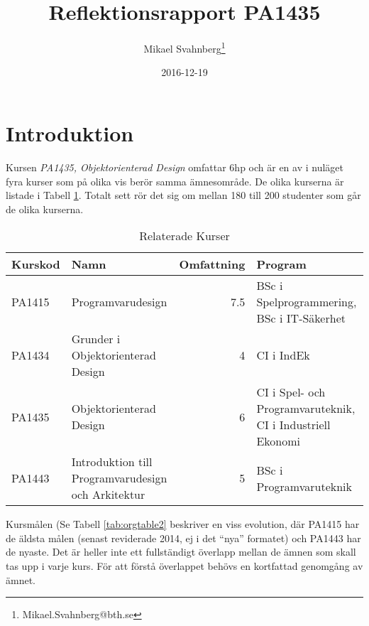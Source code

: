 \documentclass[10pt,t,a4paper]{article}
\author{Mikael Svahnberg\thanks{Mikael.Svahnberg@bth.se}}
\date{2016-12-19}
\title{Reflektionsrapport PA1435}
\begin{document}
\maketitle


\section{Introduktion}
\label{sec:orgheadline2}
Kursen \emph{PA1435, Objektorienterad Design} omfattar 6hp och är en av i nuläget fyra kurser som på olika vis berör samma ämnesområde. De olika kurserna är listade i Tabell \ref{tab:orgtable1}. Totalt sett rör det sig om mellan 180 till 200 studenter som går de olika kurserna.

\begin{table}[!b]
\caption{\label{tab:orgtable1}
Relaterade Kurser}
\centering
\begin{tabular}{lp{4cm}rp{4cm}}
Kurskod & Namn & Omfattning & Program\\
\hline
PA1415 & Programvarudesign & 7.5 & BSc i Spelprogrammering, BSc i IT-Säkerhet\\
PA1434 & Grunder i Objektorienterad Design & 4 & CI i IndEk\\
PA1435 & Objektorienterad Design & 6 & CI i Spel- och Programvaruteknik, CI i Industriell Ekonomi\\
PA1443 & Introduktion till Programvarudesign och Arkitektur & 5 & BSc i Programvaruteknik\\
\hline
\end{tabular}
\end{table}

Kursmålen (Se Tabell \ref{tab:orgtable2} beskriver en viss evolution, där PA1415 har de äldsta målen (senast reviderade 2014, ej i det ``nya'' formatet) och PA1443 har de nyaste. Det är heller inte ett fullständigt överlapp mellan de ämnen som skall tas upp i varje kurs. För att förstå överlappet behövs en kortfattad genomgång av ämnet.
\end{document}
